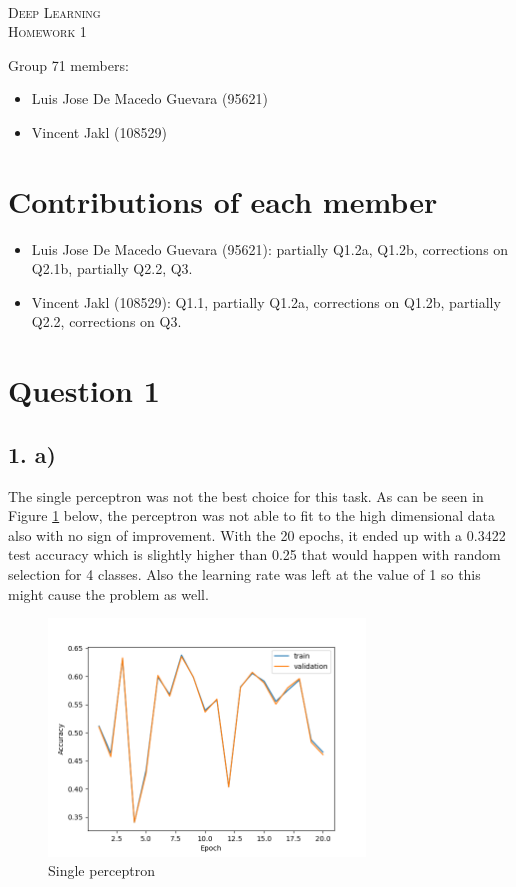 \documentclass[11pt]{article}
\begin{document}
\begin{center}
  \mbox{}\\[2.0cm]
  \textsc{\Huge Deep Learning}\\[1.0cm]
  \textsc{\Large Homework 1}\\[0.5cm]
\end{center}
\begin{flushleft}
  Group 71 members: \\[0.5cm]
  \begin{itemize}
  \item Luis Jose De Macedo Guevara (95621)
  \item Vincent Jakl (108529)
  \end{itemize}
\end{flushleft}

\section{Contributions of each member}
\begin{itemize}
    \item Luis Jose De Macedo Guevara (95621): partially Q1.2a, Q1.2b, corrections on Q2.1b, partially Q2.2, Q3.
    \item Vincent Jakl (108529): Q1.1, partially Q1.2a, corrections on Q1.2b, partially Q2.2, corrections on Q3.
\end{itemize}
\pagebreak
\section{Question 1}
\subsection{1. a)}
The single perceptron was not the best choice for this task.
As can be seen in Figure \ref{fig:single_layer_perceptron} below, the perceptron was not able to fit to the high dimensional data also with no sign of improvement.
With the 20 epochs, it ended up with a 0.3422 test accuracy which is slightly higher than 0.25 that would happen with random selection for 4 classes.
Also the learning rate was left at the value of 1 so this might cause the problem as well.
\begin{figure}[h!]
  \centering
  \includegraphics[width=0.75\textwidth]{./plots/single_perceptron.png}
  \caption{Single perceptron}\label{fig:single_layer_perceptron}
\end{figure}
\end{document}
